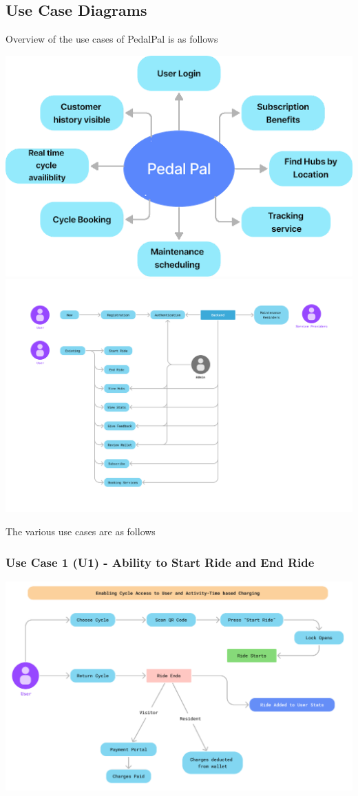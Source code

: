 \documentclass[11pt]{article}
\begin{document}
\subsection{Use Case Diagrams}
Overview of the use cases of PedalPal is as follows
\begin{center}
  \includegraphics[scale=0.75]{../srs/Overview.png}
    \includegraphics[scale=0.25]{../srs/usecase.png}
\end{center}
The various use cases are as follows
\subsubsection{Use Case 1 (U1) - Ability to Start Ride and End Ride}
\begin{center}
  \includegraphics[scale=0.5]{../srs/usecase-1.png}
\end{center}
\end{document}
